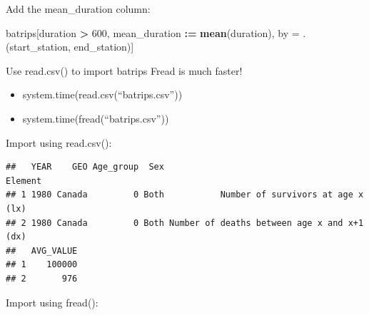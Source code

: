 \documentclass[]{book}
\newenvironment{Shaded}{\begin{snugshade}}{\end{snugshade}}
\newcommand{\DataTypeTok}[1]{\textcolor[rgb]{0.13,0.29,0.53}{#1}}
\newcommand{\DecValTok}[1]{\textcolor[rgb]{0.00,0.00,0.81}{#1}}
\newcommand{\ErrorTok}[1]{\textcolor[rgb]{0.64,0.00,0.00}{\textbf{#1}}}
\newcommand{\KeywordTok}[1]{\textcolor[rgb]{0.13,0.29,0.53}{\textbf{#1}}}
\newcommand{\NormalTok}[1]{#1}
\newcommand{\OperatorTok}[1]{\textcolor[rgb]{0.81,0.36,0.00}{\textbf{#1}}}
\newcommand{\OtherTok}[1]{\textcolor[rgb]{0.56,0.35,0.01}{#1}}
\newcommand{\StringTok}[1]{\textcolor[rgb]{0.31,0.60,0.02}{#1}}
\providecommand{\tightlist}{%
  \setlength{\itemsep}{0pt}\setlength{\parskip}{0pt}}
\begin{document}
Add the mean\_duration column:

\begin{Shaded}
\begin{Highlighting}[]
\NormalTok{batrips[duration }\OperatorTok{>}\StringTok{ }\DecValTok{600}\NormalTok{, mean_duration }\OperatorTok{:}\ErrorTok{=}\StringTok{ }\KeywordTok{mean}\NormalTok{(duration), }
\NormalTok{        by =}\StringTok{ }\NormalTok{.(start_station, end_station)]}
\end{Highlighting}
\end{Shaded}

Use read.csv() to import batrips
Fread is much faster!

\begin{itemize}
\tightlist
\item
  system.time(read.csv(``batrips.csv''))
\item
  system.time(fread(``batrips.csv''))
\end{itemize}

Import using read.csv():

\begin{Shaded}
\end{Shaded}

\begin{verbatim}
##   YEAR    GEO Age_group  Sex                                     Element
## 1 1980 Canada         0 Both           Number of survivors at age x (lx)
## 2 1980 Canada         0 Both Number of deaths between age x and x+1 (dx)
##   AVG_VALUE
## 1    100000
## 2       976
\end{verbatim}

Import using fread():

\begin{Shaded}
\end{Shaded}
\end{document}
